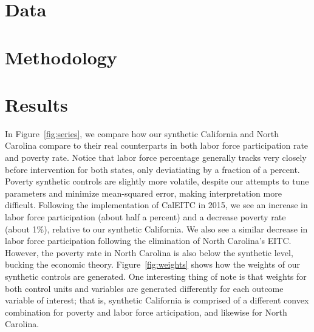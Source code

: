 \documentclass{article}
\begin{document}
\section{Data}


\section{Methodology}


\section{Results}

In Figure~\ref{fig:series}, we compare how our synthetic California and North Carolina compare to their real counterparts in both labor force participation rate and poverty rate. Notice that labor force percentage generally tracks very closely before intervention for both states, only deviatiating by a fraction of a percent. Poverty synthetic controls are slightly more volatile, despite our attempts to tune parameters and minimize mean-squared error, making interpretation more difficult. Following the implementation of CalEITC in 2015, we see an increase in labor force participation (about half a percent) and a decrease poverty rate (about 1\%), relative to our synthetic California. We also see a similar decrease in labor force participation following the elimination of North Carolina's EITC. However, the poverty rate in North Carolina is also below the synthetic level, bucking the economic theory. Figure~\ref{fig:weights} shows how the weights of our synthetic controls are generated. One interesting thing of note is that weights for both control units and variables are generated differently for each outcome variable of interest; that is, synthetic California is comprised of a different convex combination for poverty and labor force articipation, and likewise for North Carolina.

\end{document}
